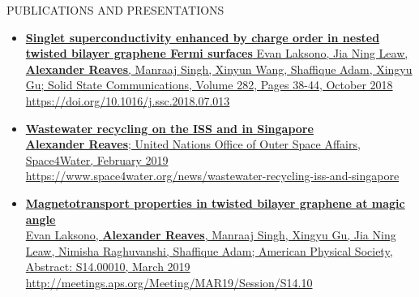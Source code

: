 \documentclass{resume} %
\begin{document}
\begin{rSection}{PUBLICATIONS AND PRESENTATIONS} 
\begin{itemize}[leftmargin={0 pt}, label={}, topsep=0pt]

\item \href{https://doi.org/10.1016/j.ssc.2018.07.013}{\textbf{Singlet superconductivity enhanced by charge order in nested twisted bilayer graphene Fermi surfaces}  
Evan Laksono, Jia Ning Leaw, \textbf{Alexander Reaves}, Manraaj Singh, Xinyun Wang, Shaffique Adam, Xingyu Gu;
Solid State Communications,
Volume 282,
Pages 38-44,
October 2018\\
https://doi.org/10.1016/j.ssc.2018.07.013 }

\item \href{https://www.space4water.org/news/wastewater-recycling-iss-and-singapore}{\textbf{Wastewater recycling on the ISS and in Singapore} \\
\textbf{Alexander Reaves}; United Nations Office of Outer Space Affairs, Space4Water, February 2019\\ https://www.space4water.org/news/wastewater-recycling-iss-and-singapore}

\item \href{http://meetings.aps.org/Meeting/MAR19/Session/S14.10}{\textbf{Magnetotransport properties in twisted bilayer graphene at magic angle} \\
Evan Laksono,  \textbf{Alexander Reaves}, Manraaj Singh, Xingyu Gu, Jia Ning Leaw, Nimisha Raghuvanshi, Shaffique Adam; American Physical Society, Abstract: S14.00010, March 2019\\ http://meetings.aps.org/Meeting/MAR19/Session/S14.10}

\end{itemize}
\end{rSection}
\end{document}
